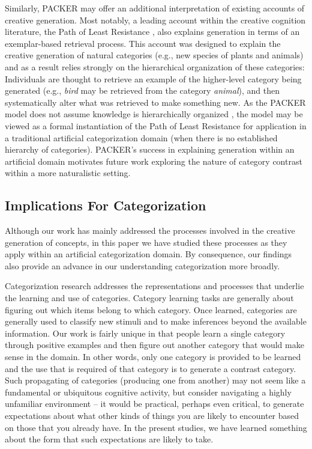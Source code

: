\documentclass[12pt]{article}
\begin{document}
\begin{flushleft}
Similarly, PACKER may offer an additional interpretation of existing accounts of creative generation. Most notably, a leading account within the creative cognition literature, the Path of Least Resistance \citep{ward1994structured,ward1995s}, also explains generation in terms of an exemplar-based retrieval process. This account was designed to explain the creative generation of natural categories (e.g., new species of plants and animals) and as a result relies strongly on the hierarchical organization of these categories: Individuals are thought to retrieve an example of the higher-level category being generated (e.g., \textit{bird} may be retrieved from the category \textit{animal}), and then systematically alter what was retrieved to make something new. As the PACKER model does not assume knowledge is hierarchically organized \citep[this is true of the exemplar view more broadly, see][]{murphy2016exemplar}, the model may be viewed as a formal instantiation of the Path of Least Resistance for application in a traditional artificial categorization domain (when there is no established hierarchy of categories). PACKER's success in explaining generation within an artificial domain motivates future work exploring the nature of category contrast within a more naturalistic setting.

\subsection{Implications For Categorization}

Although our work has mainly addressed the processes involved in the creative generation of  concepts, in this paper we have studied these processes as they apply within an artificial categorization domain. By consequence, our findings also provide an advance in our understanding categorization more broadly.

Categorization research addresses the representations and processes that underlie the learning and use of categories. Category learning tasks are generally about figuring out which items belong to which category. Once learned, categories are generally used to classify new stimuli and to make inferences beyond the available information. Our work is fairly unique in that people learn a single category through positive examples and then figure out another category that would make sense in the domain. In other words, only one category is provided to be learned and the use that is required of that category is to generate a contrast category. Such propagating of categories (producing one from another) may not seem like a fundamental or ubiquitous cognitive activity, but consider navigating a highly unfamiliar environment -- it would be practical, perhaps even critical, to generate expectations about what other kinds of things you are likely to encounter based on those that you already have. In the present studies, we have learned something about the form that such expectations are likely to take. 


\end{flushleft}
\end{document}
